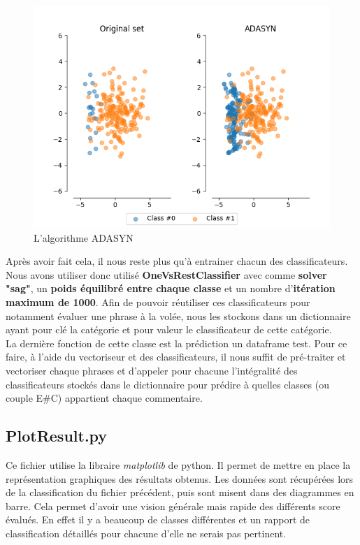 \documentclass[12pt ,a4paper ]{article}
\begin{document}
\begin{multicols}{2}
\begin{figure}[H]
    \begin{center}
        \includegraphics[scale=0.62]{adasyn.png}
    \end{center}
\caption{\small{L'algorithme ADASYN}}
\end{figure}

Après avoir fait cela, il nous reste plus qu'à entrainer chacun des classificateurs. Nous avons utiliser donc utilisé \textbf{OneVsRestClassifier} avec comme\textbf{ solver "sag"}, un \textbf{poids équilibré entre chaque classe} et un nombre d'\textbf{itération maximum de 1000}. Afin de pouvoir réutiliser ces classificateurs pour notamment évaluer une phrase à la volée, nous les stockons dans un dictionnaire ayant pour clé la catégorie et pour valeur le classificateur de cette catégorie.\\

La dernière fonction de cette classe est la prédiction un dataframe test. Pour ce faire, à l'aide du vectoriseur et des classificateurs, il nous suffit de pré-traiter et vectoriser chaque phrases et d'appeler pour chacune l'intégralité des classificateurs stockés dans le dictionnaire pour prédire à quelles classes (ou couple E\#C) appartient chaque commentaire.

\subsection{PlotResult.py}
Ce fichier utilise la libraire \textit{matplotlib} de python. Il permet de mettre en place la représentation graphiques des résultats obtenus. Les données sont récupérées lors de la classification du fichier précédent, puis sont misent dans des diagrammes en barre. Cela permet d'avoir une vision générale mais rapide des différents score évalués. En effet il y a beaucoup de classes différentes et un rapport de classification détaillés pour chacune d'elle ne serais pas pertinent.


\end{multicols}
\end{document}

